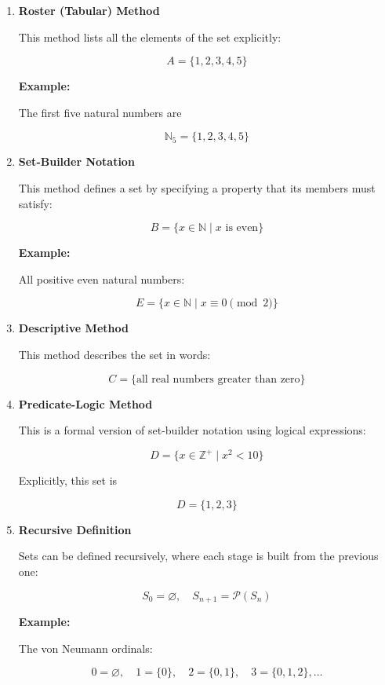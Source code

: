 \documentclass[12pt,a4paper,openany]{article}
\begin{document}
\begin{enumerate}
    \item \textbf{Roster (Tabular) Method}
    
    This method lists all the elements of the set explicitly:
    
    $$A = \{1, 2, 3, 4, 5\}$$
    
    \textbf{Example:}
    
    The first five natural numbers are
    
    $$\mathbb{N}_5 = \{1, 2, 3, 4, 5\}$$
    
    \item \textbf{Set-Builder Notation}
    
    This method defines a set by specifying a property that its members must satisfy:
    
    $$B = \{x \in \mathbb{N} \mid x \text{ is even} \}$$
    
    \textbf{Example:}
    
    All positive even natural numbers:
    
    $$E = \{x \in \mathbb{N} \mid x \equiv 0 \pmod{2}\}$$
    
    \item \textbf{Descriptive Method}
    
    This method describes the set in words:
    
    $$C = \{\text{all real numbers greater than zero}\}$$
    
    \item \textbf{Predicate-Logic Method}
    
    This is a formal version of set-builder notation using logical expressions:
    
    $$ D = \{x \in \mathbb{Z}^+ \mid x^2 < 10\} $$
    
    Explicitly, this set is
    
    $$ D = \{1, 2, 3\} $$
    
    \item \textbf{Recursive Definition}
    
    Sets can be defined recursively, where each stage is built from the previous one:
    
    $$S_0 = \varnothing, \quad S_{n+1} = \mathcal{P}(S_n)$$
    
    \textbf{Example:}
    
    The von Neumann ordinals:
    
    $$0 = \varnothing, \quad 1 = \{0\}, \quad 2 = \{0, 1\}, \quad 3 = \{0, 1, 2\}, \dots$$
    

\end{enumerate}
\end{document}

